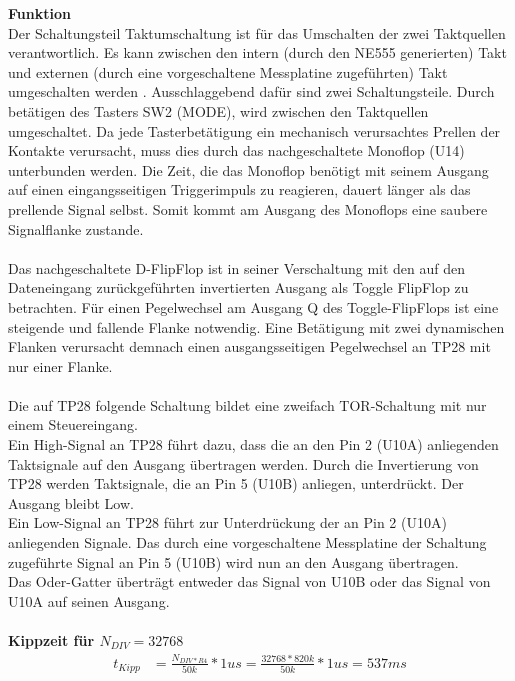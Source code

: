 \textbf{Funktion}
\\
Der Schaltungsteil \glqq Taktumschaltung \grqq{} ist für das Umschalten der zwei Taktquellen verantwortlich. Es kann zwischen den intern (durch den NE555 generierten) Takt und externen (durch eine vorgeschaltene Messplatine zugeführten) Takt umgeschalten werden . Ausschlaggebend dafür sind zwei Schaltungsteile. Durch betätigen des Tasters SW2 (MODE), wird zwischen den Taktquellen umgeschaltet. Da jede Tasterbetätigung ein mechanisch verursachtes Prellen der Kontakte verursacht, muss dies durch das nachgeschaltete  Monoflop (U14) unterbunden werden. Die Zeit, die das Monoflop benötigt mit seinem Ausgang auf einen eingangsseitigen Triggerimpuls zu reagieren, dauert länger als das prellende Signal selbst. Somit kommt am Ausgang des Monoflops eine saubere Signalflanke zustande. 
\\
\\
Das nachgeschaltete D-FlipFlop ist in seiner Verschaltung mit den auf den Dateneingang zurückgeführten invertierten Ausgang als Toggle FlipFlop zu betrachten. Für einen Pegelwechsel am Ausgang Q des Toggle-FlipFlops ist eine steigende und fallende Flanke notwendig. Eine Betätigung mit zwei dynamischen Flanken verursacht demnach einen ausgangsseitigen Pegelwechsel an TP28 mit nur einer Flanke. 
\\
\\
Die auf TP28 folgende Schaltung bildet eine zweifach TOR-Schaltung mit nur einem Steuereingang.
\\
Ein High-Signal an TP28 führt dazu, dass die an den Pin 2 (U10A) anliegenden Taktsignale auf den Ausgang übertragen werden. Durch die Invertierung von TP28 werden Taktsignale, die an Pin 5 (U10B) anliegen, unterdrückt. Der Ausgang bleibt Low.
\\
Ein Low-Signal an TP28 führt zur Unterdrückung der an Pin 2 (U10A) anliegenden Signale. Das durch eine vorgeschaltene Messplatine der Schaltung zugeführte Signal an Pin 5 (U10B) wird nun an den Ausgang übertragen.
\\
Das Oder-Gatter überträgt entweder das Signal von U10B oder das Signal von U10A auf seinen Ausgang. 
\\
\\
\textbf{Kippzeit für $N_{DIV} = 32 768$}
\\
\begin{align*}
	t_{Kipp} &= \frac{N_{DIV * R4}}{50k} * 1us = \frac{32768 * 820k}{50k} * 1us = 537ms
\end{align*}


